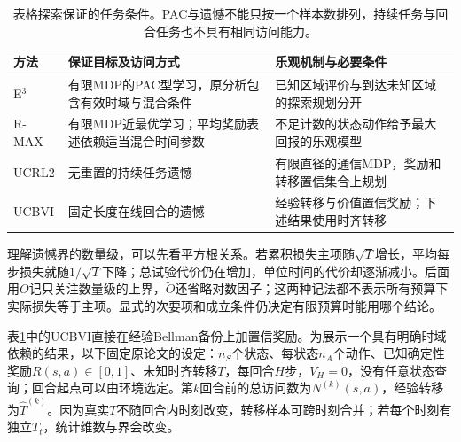 \begin{table}[t]
  \centering
  \small
  \begin{tabularx}{\linewidth}{>{\raggedright\arraybackslash}p{20mm} >{\raggedright\arraybackslash}X >{\raggedright\arraybackslash}X}
    \toprule
    方法 & 保证目标及访问方式 & 乐观机制与必要条件 \\
    \midrule
    E$^3$ & 有限MDP的PAC型学习，原分析包含有效时域与混合条件 & 已知区域评价与到达未知区域的探索规划分开 \\
    R-MAX & 有限MDP近最优学习；平均奖励表述依赖适当混合时间参数 & 不足计数的状态动作给予最大回报的乐观模型 \\
    UCRL2 & 无重置的持续任务遗憾 & 有限直径的通信MDP，奖励和转移置信集合上规划 \\
    UCBVI & 固定长度在线回合的遗憾 & 经验转移与价值置信奖励；下述结果使用时齐转移 \\
    \bottomrule
  \end{tabularx}
  \caption{表格探索保证的任务条件。PAC与遗憾不能只按一个样本数排列，持续任务与回合任务也不具有相同访问能力。}
  \label{tab:rl-learning-tabular-methods}
\end{table}

理解遗憾界的数量级，可以先看平方根关系。若累积损失主项随$\sqrt T$增长，平均每步损失就随$1/\sqrt T$下降；总试验代价仍在增加，单位时间的代价却逐渐减小。后面用$O$记只关注数量级的上界，$\widetilde O$还省略对数因子；这两种记法都不表示所有预算下实际损失等于主项。显式的次要项和成立条件仍决定有限预算时能用哪个结论。

表\ref{tab:rl-learning-tabular-methods}中的UCBVI直接在经验Bellman备份上加置信奖励。为展示一个具有明确时域依赖的结果，以下固定原论文的设定：$n_S$个状态、每状态$n_A$个动作、已知确定性奖励$R(s,a)\in[0,1]$、未知时齐转移$T$，每回合$H$步，$V_H=0$，没有任意状态查询；回合起点可以由环境选定。第$k$回合前的总访问数为$N^{(k)}(s,a)$，经验转移为$\widehat T^{(k)}$。因为真实$T$不随回合内时刻改变，转移样本可跨时刻合并；若每个时刻有独立$T_t$，统计维数与界会改变。

